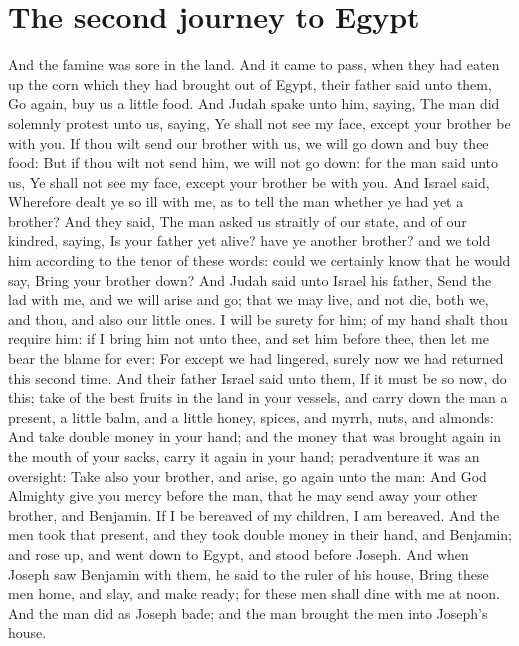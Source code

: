 \section*{The second journey to Egypt}
\begin{biblechapter} %
\verse And the famine was sore in the land.
\verse And it came to pass, when they had eaten up the corn which they had brought out of Egypt, their father said unto them, Go again, buy us a little food.
\verse And Judah spake unto him, saying, The man did solemnly protest unto us, saying, Ye shall not see my face, except your brother be with you.
\verse If thou wilt send our brother with us, we will go down and buy thee food:
\verse But if thou wilt not send him, we will not go down: for the man said unto us, Ye shall not see my face, except your brother be with you.
\verse And Israel said, Wherefore dealt ye so ill with me, as to tell the man whether ye had yet a brother?
\verse And they said, The man asked us straitly of our state, and of our kindred, saying, Is your father yet alive? have ye another brother? and we told him according to the tenor of these words: could we certainly know that he would say, Bring your brother down?
\verse And Judah said unto Israel his father, Send the lad with me, and we will arise and go; that we may live, and not die, both we, and thou, and also our little ones.
\verse I will be surety for him; of my hand shalt thou require him: if I bring him not unto thee, and set him before thee, then let me bear the blame for ever:
\verse For except we had lingered, surely now we had returned this second time.
\verse And their father Israel said unto them, If it must be so now, do this; take of the best fruits in the land in your vessels, and carry down the man a present, a little balm, and a little honey, spices, and myrrh, nuts, and almonds:
\verse And take double money in your hand; and the money that was brought again in the mouth of your sacks, carry it again in your hand; peradventure it was an oversight:
\verse Take also your brother, and arise, go again unto the man:
\verse And God Almighty give you mercy before the man, that he may send away your other brother, and Benjamin. If I be bereaved of my children, I am bereaved.
\verse And the men took that present, and they took double money in their hand, and Benjamin; and rose up, and went down to Egypt, and stood before Joseph.
\verse And when Joseph saw Benjamin with them, he said to the ruler of his house, Bring these men home, and slay, and make ready; for these men shall dine with me at noon.
\verse And the man did as Joseph bade; and the man brought the men into Joseph's house.

\end{biblechapter}
